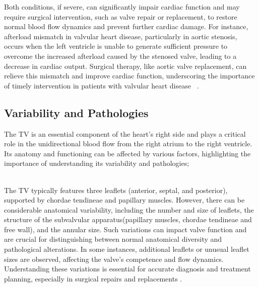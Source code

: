 Both conditions, if severe, can significantly impair cardiac function and may require surgical intervention, such as valve repair or replacement, to restore normal blood flow dynamics and prevent further cardiac damage. For instance, afterload mismatch in valvular heart disease, particularly in aortic stenosis, occurs when the left ventricle is unable to generate sufficient pressure to overcome the increased afterload caused by the stenosed valve, leading to a decrease in cardiac output. Surgical therapy, like aortic valve replacement, can relieve this mismatch and improve cardiac function, underscoring the importance of timely intervention in patients with valvular heart disease ~.

\subsection{Variability and Pathologies}
The \gls{TV} is an essential component of the heart's right side and plays a critical role in the unidirectional blood flow from the right atrium to the right ventricle. Its anatomy and functioning can be affected by various factors, highlighting the importance of understanding its variability and pathologies;

\\
The \gls{TV} typically features three leaflets (anterior, septal, and posterior), supported by chordae tendineae and papillary muscles. However, there can be considerable anatomical variability, including the number and size of leaflets, the structure of the subvalvular apparatus(papillary muscles, chordae tendineae and free wall), and the annular size. Such variations can impact valve function and are crucial for distinguishing between normal anatomical diversity and pathological alterations. In some instances, additional leaflets or unusual leaflet sizes are observed, affecting the valve's competence and flow dynamics. Understanding these variations is essential for accurate diagnosis and treatment planning, especially in surgical repairs and replacements .~

